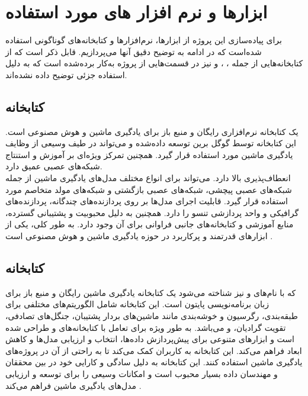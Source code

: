 \section{ابزار‌ها و نرم افزار های مورد استفاده}
برای پیاده‌سازی این پروژه از ابزار‌ها، نرم‌افزار‌ها و کتابخانه‌های گوناگونی استفاده شده‌است که در ادامه به توضیح دقیق آنها می‌پردازیم. قابل ذکر است که از کتابخانه‌هایی از جمله ، ،  و  نیز در قسمت‌هایی از پروژه به‌کار برده‌شده است که به دلیل استفاده جزئی توضیح داده نشده‌اند.


\subsection{کتابخانه }
 یک کتابخانه نرم‌افزاری رایگان و منبع باز برای یادگیری ماشین و هوش مصنوعی است. این کتابخانه توسط گوگل برین توسعه داده‌شده و می‌تواند در طیف وسیعی 
از وظایف یادگیری ماشین مورد استفاده قرار گیرد. همچنین تمرکز ویژه‌ای بر آموزش و استنتاج شبکه‌های عصبی عمیق دارد. 
\\
 انعطاف‌پذیری بالا دارد. می‌تواند برای انواع مختلف مدل‌های یادگیری ماشین از جمله شبکه‌های عصبی پیچشی، شبکه‌های عصبی بازگشتی و شبکه‌های مولد متخاصم مورد استفاده قرار گیرد.
 قابلیت اجرای مدل‌ها بر روی پردازنده‌های چندگانه، پردازنده‌های گرافیکی و واحد پردازشی تنسو را دارد. همچنین به دلیل محبوبیت و پشتیبانی گسترده،
منابع آموزشی و کتابخانه‌های جانبی فراوانی برای آن وجود دارد. به طور کلی،  یکی از ابزارهای قدرتمند و پرکاربرد در حوزه یادگیری ماشین و هوش مصنوعی است \cite{Introduc60:online}.


\subsection{کتابخانه }
 که با نام‌های  و  نیز شناخته می‌شود یک کتابخانه یادگیری ماشین رایگان و منبع باز برای زبان برنامه‌نویسی پایتون است. این کتابخانه شامل الگوریتم‌های مختلفی برای طبقه‌بندی،
رگرسیون و خوشه‌بندی مانند ماشین‌های بردار پشتیبان، جنگل‌های تصادفی، تقویت گرادیان،  و  می‌باشد.  به طور ویژه برای تعامل با
کتابخانه‌های  و  طراحی شده است و ابزارهای متنوعی برای پیش‌پردازش داده‌ها، انتخاب و ارزیابی مدل‌ها و کاهش ابعاد فراهم می‌کند. این کتابخانه به کاربران کمک می‌کند تا به راحتی از آن در پروژه‌های 
یادگیری ماشین استفاده کنند. این کتابخانه به دلیل سادگی و کارایی خود در بین محققان و مهندسان داده بسیار محبوب است و امکانات وسیعی را برای توسعه و ارزیابی مدل‌های یادگیری ماشین فراهم می‌کند \cite{scikitle22:online}.

